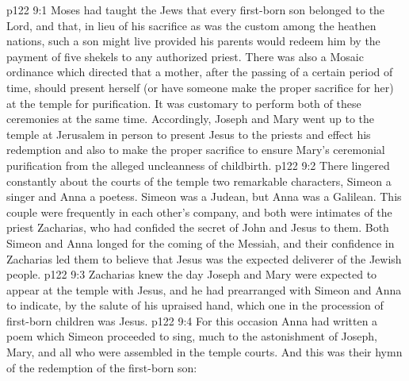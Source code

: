 \vs p122 9:1 Moses had taught the Jews that every first\hyp{}born son belonged to the Lord, and that, in lieu of his sacrifice as was the custom among the heathen nations, such a son might live provided his parents would redeem him by the payment of five shekels to any authorized priest. There was also a Mosaic ordinance which directed that a mother, after the passing of a certain period of time, should present herself (or have someone make the proper sacrifice for her) at the temple for purification. It was customary to perform both of these ceremonies at the same time. Accordingly, Joseph and Mary went up to the temple at Jerusalem in person to present Jesus to the priests and effect his redemption and also to make the proper sacrifice to ensure Mary’s ceremonial purification from the alleged uncleanness of childbirth.
\vs p122 9:2 \pc There lingered constantly about the courts of the temple two remarkable characters, Simeon a singer and Anna a poetess. Simeon was a Judean, but Anna was a Galilean. This couple were frequently in each other’s company, and both were intimates of the priest Zacharias, who had confided the secret of John and Jesus to them. Both Simeon and Anna longed for the coming of the Messiah, and their confidence in Zacharias led them to believe that Jesus was the expected deliverer of the Jewish people.
\vs p122 9:3 Zacharias knew the day Joseph and Mary were expected to appear at the temple with Jesus, and he had prearranged with Simeon and Anna to indicate, by the salute of his upraised hand, which one in the procession of first\hyp{}born children was Jesus.
\vs p122 9:4 For this occasion Anna had written a poem which Simeon proceeded to sing, much to the astonishment of Joseph, Mary, and all who were assembled in the temple courts. And this was their hymn of the redemption of the first\hyp{}born son:
